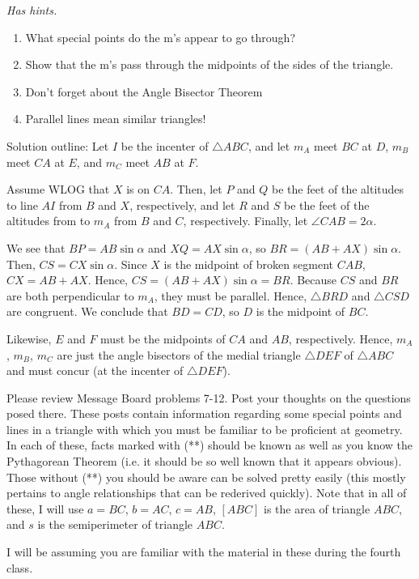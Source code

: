 \textit{Has hints.}
\begin{sketch}
    \begin{enumerate}
        \item What special points do the m's appear to go through?
        \item Show that the m's pass through the midpoints of the sides of the triangle.
        \item Don't forget about the Angle Bisector Theorem
        \item Parallel lines mean similar triangles!
    \end{enumerate}
\end{sketch}

\begin{mdsoln}
Solution outline:
Let $I$ be the incenter of $\triangle ABC$, and let $m_A$ meet $BC$ at $D$, $m_B$ meet $CA$ at $E$, and $m_C$ meet $AB$ at $F$.

Assume WLOG that $X$ is on $CA$. Then, let $P$ and $Q$ be the feet of the altitudes to line $AI$ from $B$ and $X$, respectively, and let $R$ and $S$ be the feet of the altitudes from to $m_A$ from $B$ and $C$, respectively. Finally, let $\angle CAB=2\alpha$.

We see that $BP=AB\sin \alpha$ and $XQ=AX\sin \alpha$, so $BR=(AB+AX)\sin \alpha$. Then, $CS=CX\sin \alpha$. Since $X$ is the midpoint of broken segment $CAB$, $CX=AB+AX$. Hence, $CS=(AB+AX)\sin\alpha=BR$. Because $CS$ and $BR$ are both perpendicular to $m_A$, they must be parallel. Hence, $\triangle BRD$ and $\triangle CSD$ are congruent. We conclude that $BD=CD$, so $D$ is the midpoint of $BC$.

Likewise, $E$ and $F$ must be the midpoints of $CA$ and $AB$, respectively. Hence, $m_A$, $m_B$, $m_C$ are just the angle bisectors of the medial triangle $\triangle DEF$ of $\triangle ABC$ and must concur (at the incenter of $\triangle DEF$).
    
\end{mdsoln}

\begin{remark*}
    Please review Message Board problems 7-12. Post your thoughts on the questions posed there. These posts contain information regarding some special points and lines in a triangle with which you must be familiar to be proficient at geometry. In each of these, facts marked with (**) should be known as well as you know the Pythagorean Theorem (i.e. it should be so well known that it appears obvious). Those without (**) you should be aware can be solved pretty easily (this mostly pertains to angle relationships that can be rederived quickly). Note that in all of these, I will use $a = BC$, $b = AC$, $c = AB$, $[ABC]$ is the area of triangle $ABC$, and $s$ is the semiperimeter of triangle $ABC$.

    I will be assuming you are familiar with the material in these during the fourth class.        
\end{remark*}

